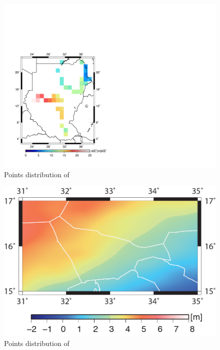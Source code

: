       \begin{figure}[t]
      	\caption{Points distribution of \cite{osman}}
      	\label{figure:point_astro_dist}
      	\includegraphics{Figures/points_astro_dist.pdf}
      	\centering
      \end{figure}
      
    \begin{figure}[t]
          	\caption{Points distribution of \cite{ahmed_msc}}
          	\label{figure:point_gps_dist}
          	\includegraphics{Figures/krt.png}
          	\centering
    \end{figure}
    

